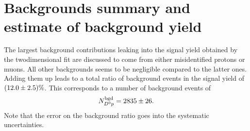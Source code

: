 \section{Backgrounds summary and estimate of background yield}
The largest background contributions leaking into the signal yield \NDp obtained by the twodimensional fit are discussed to come from either misidentified protons or muons.
All other backgrounds seems to be negligible compared to the latter ones.
Adding them up leads to a total ratio of background events in the signal yield of $(12.0 \pm 2.5)\%$.
This corresponds to a number of background events of 
\begin{align*}
    N^{\rm bgd}_{{{D}^0}{p}} = 2835 \pm 26.
\end{align*}
Note that the error on the background ratio goes into the systematic uncertainties.
